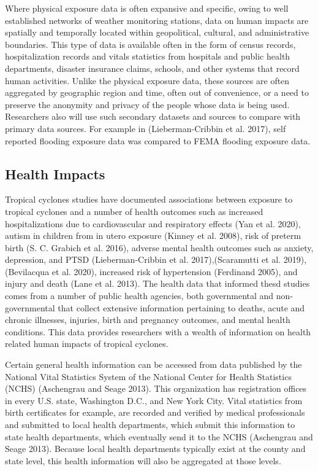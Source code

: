\documentclass[
]{article}
\begin{document}
Where physical exposure data is often expansive and specific, owing to
well established networks of weather monitoring stations, data on human
impacts are spatially and temporally located within geopolitical,
cultural, and administrative boundaries. This type of data is available
often in the form of census records, hospitalization records and vitals
statistics from hospitals and public health departments, disaster
insurance claims, schools, and other systems that record human
activities. Unlike the physical exposure data, these sources are often
aggregated by geographic region and time, often out of convenience, or a
need to preserve the anonymity and privacy of the people whose data is
being used. Researchers also will use such secondary datasets and
sources to compare with primary data sources. For example in
(Lieberman-Cribbin et al. 2017), self reported flooding exposure data
was compared to FEMA flooding exposure data.

\hypertarget{health-impacts}{%
\subsection{Health Impacts}\label{health-impacts}}

Tropical cyclones studies have documented associations between exposure
to tropical cyclones and a number of health outcomes such as increased
hospitalizations due to cardiovascular and respiratory effects (Yan et
al. 2020), autism in children from in utero exposure (Kinney et al.
2008), risk of preterm birth (S. C. Grabich et al. 2016), adverse mental
health outcomes such as anxiety, depression, and PTSD (Lieberman-Cribbin
et al. 2017),(Scaramutti et al. 2019),(Bevilacqua et al. 2020),
increased risk of hypertension (Ferdinand 2005), and injury and death
(Lane et al. 2013). The health data that informed thesd studies comes
from a number of public health agencies, both governmental and
non-governmental that collect extensive information pertaining to
deaths, acute and chronic illnesses, injuries, birth and pregnancy
outcomes, and mental health conditions. This data provides researchers
with a wealth of information on health related human impacts of tropical
cyclones.

Certain general health information can be accessed from data published
by the National Vital Statistics System of the National Center for
Health Statistics (NCHS) (Aschengrau and Seage 2013). This organization
has registration offices in every U.S. state, Washington D.C., and New
York City. Vital statistics from birth certificates for example, are
recorded and verified by medical professionals and submitted to local
health departments, which submit this information to state health
departments, which eventually send it to the NCHS (Aschengrau and Seage
2013). Because local health departments typically exist at the county
and state level, this health information will also be aggregated at
those levels.
\end{document}
